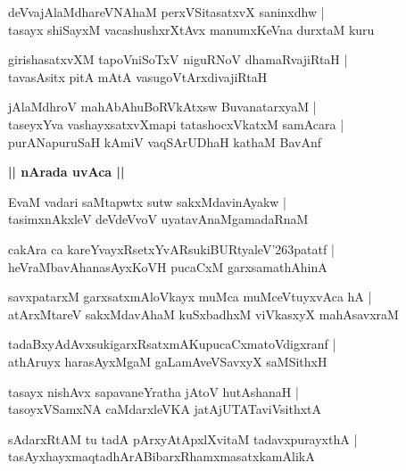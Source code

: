 \documentclass[twoside,12pt,openright]{book}
\def\S{\char'263}
\newcounter{shloka}[chapter]
\def\uvaca#1{\centerline{{\large\textbf{#1}}}}
\begin{document}
\begin{shloka}%
deVvajAlaMdhareVNAhaM perxVSitasatxvX saninxdhw |\\
tasayx shiSayxM vacashushxrXtAvx manumxKeVna durxtaM kuru 
\end{shloka}

\begin{shloka}%
girishasatxvXM tapoVniSoTxV niguRNoV dhamaRvajiRtaH |\\
tavasAsitx pitA mAtA vasugoVtArxdivajiRtaH 
\end{shloka}

\begin{shloka}%
jAlaMdhroV mahAbAhuBoRVkAtxsw BuvanatarxyaM |\\
taseyxYva vashayxsatxvXmapi tatashocxVkatxM samAcara |\\
purANapuruSaH kAmiV vaqSArUDhaH kathaM BavAnf 
\end{shloka}

\uvaca{|| nArada uvAca ||}

\begin{shloka}%
EvaM vadari saMtapwtx sutw sakxMdavinAyakw |\\
tasimxnAkxleV deVdeVvoV uyatavAnaMgamadaRnaM 
\end{shloka}

\begin{shloka}%
cakAra ca kareYvayxRsetxYvARsukiBURtyaleV\S patatf |\\
heVraMbavAhanasAyxKoVH pucaCxM garxsamathAhinA 
\end{shloka}

\begin{shloka}%
savxpatarxM garxsatxmAloVkayx muMca muMceVtuyxvAca hA |\\
atArxMtareV sakxMdavAhaM kuSxbadhxM viVkasxyX mahAsavxraM 
\end{shloka}

\begin{shloka}%
tadaBxyAdAvxsukigarxRsatxmAKupucaCxmatoVdigxranf |\\
athAruyx harasAyxMgaM gaLamAveVSavxyX saMSithxH 
\end{shloka}

\begin{shloka}%
tasayx nishAvx sapavaneYratha jAtoV hutAshanaH |\\
tasoyxVSamxNA caMdarxleVKA jatAjUTATaviVsithxtA 
\end{shloka}

\begin{shloka}%
sAdarxRtAM tu tadA pArxyAtApxlXvitaM tadavxpurayxthA |\\
tasAyxhayxmaqtadhArABibarxRhamxmasatxkamAlikA 
\end{shloka}
\end{document}
